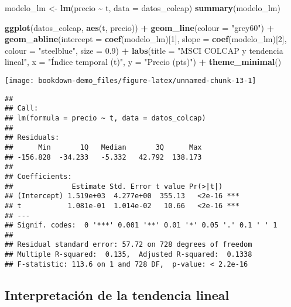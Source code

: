 \documentclass[
  11pt,
]{book}
\newenvironment{Shaded}{\begin{snugshade}}{\end{snugshade}}
\newcommand{\AttributeTok}[1]{\textcolor[rgb]{0.13,0.29,0.53}{#1}}
\newcommand{\DecValTok}[1]{\textcolor[rgb]{0.00,0.00,0.81}{#1}}
\newcommand{\FloatTok}[1]{\textcolor[rgb]{0.00,0.00,0.81}{#1}}
\newcommand{\FunctionTok}[1]{\textcolor[rgb]{0.13,0.29,0.53}{\textbf{#1}}}
\newcommand{\NormalTok}[1]{#1}
\newcommand{\OtherTok}[1]{\textcolor[rgb]{0.56,0.35,0.01}{#1}}
\newcommand{\SpecialCharTok}[1]{\textcolor[rgb]{0.81,0.36,0.00}{\textbf{#1}}}
\newcommand{\StringTok}[1]{\textcolor[rgb]{0.31,0.60,0.02}{#1}}
\begin{document}
\begin{Shaded}
\begin{Highlighting}[]
\NormalTok{modelo\_lm }\OtherTok{\textless{}{-}} \FunctionTok{lm}\NormalTok{(precio }\SpecialCharTok{\textasciitilde{}}\NormalTok{ t, }\AttributeTok{data =}\NormalTok{ datos\_colcap)}
\FunctionTok{summary}\NormalTok{(modelo\_lm)}

\FunctionTok{ggplot}\NormalTok{(datos\_colcap, }\FunctionTok{aes}\NormalTok{(t, precio)) }\SpecialCharTok{+}
  \FunctionTok{geom\_line}\NormalTok{(}\AttributeTok{colour =} \StringTok{"grey60"}\NormalTok{) }\SpecialCharTok{+}
  \FunctionTok{geom\_abline}\NormalTok{(}\AttributeTok{intercept =} \FunctionTok{coef}\NormalTok{(modelo\_lm)[}\DecValTok{1}\NormalTok{],}
              \AttributeTok{slope     =} \FunctionTok{coef}\NormalTok{(modelo\_lm)[}\DecValTok{2}\NormalTok{],}
              \AttributeTok{colour    =} \StringTok{"steelblue"}\NormalTok{, }\AttributeTok{size =} \FloatTok{0.9}\NormalTok{) }\SpecialCharTok{+}
  \FunctionTok{labs}\NormalTok{(}\AttributeTok{title =} \StringTok{"MSCI COLCAP y tendencia lineal"}\NormalTok{,}
       \AttributeTok{x =} \StringTok{"Índice temporal (t)"}\NormalTok{, }\AttributeTok{y =} \StringTok{"Precio (pts)"}\NormalTok{) }\SpecialCharTok{+}
  \FunctionTok{theme\_minimal}\NormalTok{()}
\end{Highlighting}
\end{Shaded}

\begin{center}\texttt{[image: bookdown-demo\_files/figure-latex/unnamed-chunk-13-1]} \end{center}

\begin{verbatim}
## 
## Call:
## lm(formula = precio ~ t, data = datos_colcap)
## 
## Residuals:
##      Min       1Q   Median       3Q      Max 
## -156.828  -34.233   -5.332   42.792  138.173 
## 
## Coefficients:
##              Estimate Std. Error t value Pr(>|t|)    
## (Intercept) 1.519e+03  4.277e+00  355.13   <2e-16 ***
## t           1.081e-01  1.014e-02   10.66   <2e-16 ***
## ---
## Signif. codes:  0 '***' 0.001 '**' 0.01 '*' 0.05 '.' 0.1 ' ' 1
## 
## Residual standard error: 57.72 on 728 degrees of freedom
## Multiple R-squared:  0.135,  Adjusted R-squared:  0.1338 
## F-statistic: 113.6 on 1 and 728 DF,  p-value: < 2.2e-16
\end{verbatim}

\subsection{Interpretación de la tendencia lineal}\label{interpretaciuxf3n-de-la-tendencia-lineal}
\end{document}
